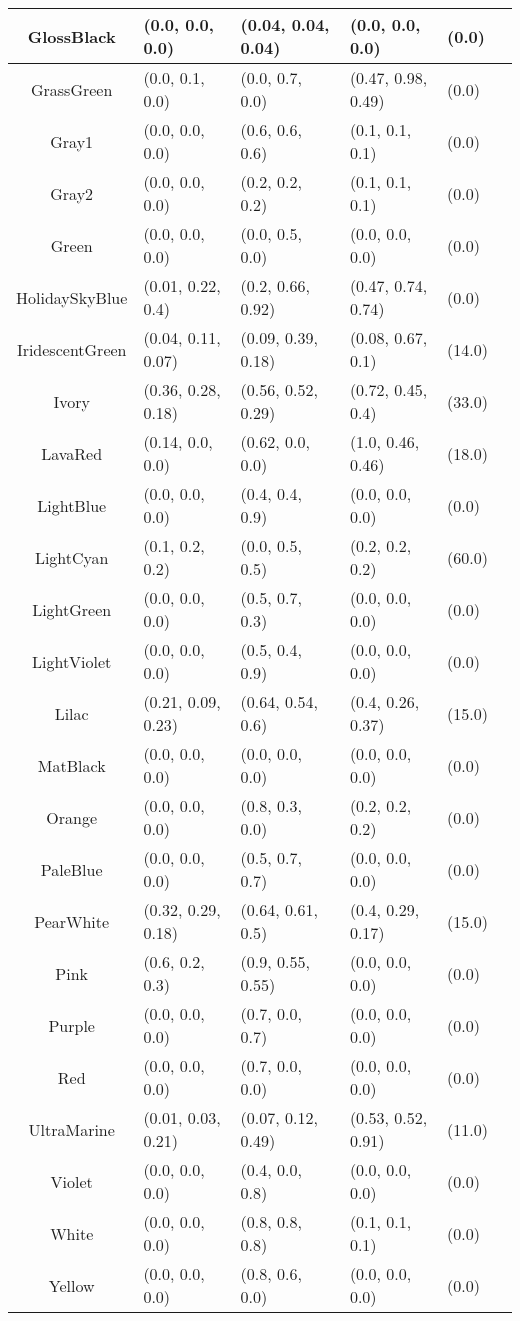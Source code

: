 \begin{table}[H]
\begin{small}
\begin{center}
\begin{tabular}{|c||l|l|l|l|l|}
GlossBlack & (0.0, 0.0, 0.0) & (0.04, 0.04, 0.04) & (0.0, 0.0, 0.0) & (0.0) \\ \hline
GrassGreen & (0.0, 0.1, 0.0) & (0.0, 0.7, 0.0) & (0.47, 0.98, 0.49) & (0.0) \\ \hline
Gray1 & (0.0, 0.0, 0.0) & (0.6, 0.6, 0.6) & (0.1, 0.1, 0.1) & (0.0) \\ \hline
Gray2 & (0.0, 0.0, 0.0) & (0.2, 0.2, 0.2) & (0.1, 0.1, 0.1) & (0.0) \\ \hline
Green & (0.0, 0.0, 0.0) & (0.0, 0.5, 0.0) & (0.0, 0.0, 0.0) & (0.0) \\ \hline
HolidaySkyBlue & (0.01, 0.22, 0.4) & (0.2, 0.66, 0.92) & (0.47, 0.74, 0.74) & (0.0) \\ \hline
IridescentGreen & (0.04, 0.11, 0.07) & (0.09, 0.39, 0.18) & (0.08, 0.67, 0.1) & (14.0) \\ \hline
Ivory & (0.36, 0.28, 0.18) & (0.56, 0.52, 0.29) & (0.72, 0.45, 0.4) & (33.0) \\ \hline
LavaRed & (0.14, 0.0, 0.0) & (0.62, 0.0, 0.0) & (1.0, 0.46, 0.46) & (18.0) \\ \hline
LightBlue & (0.0, 0.0, 0.0) & (0.4, 0.4, 0.9) & (0.0, 0.0, 0.0) & (0.0) \\ \hline
LightCyan & (0.1, 0.2, 0.2) & (0.0, 0.5, 0.5) & (0.2, 0.2, 0.2) & (60.0) \\ \hline
LightGreen & (0.0, 0.0, 0.0) & (0.5, 0.7, 0.3) & (0.0, 0.0, 0.0) & (0.0) \\ \hline
LightViolet & (0.0, 0.0, 0.0) & (0.5, 0.4, 0.9) & (0.0, 0.0, 0.0) & (0.0) \\ \hline
Lilac & (0.21, 0.09, 0.23) & (0.64, 0.54, 0.6) & (0.4, 0.26, 0.37) & (15.0) \\ \hline
MatBlack & (0.0, 0.0, 0.0) & (0.0, 0.0, 0.0) & (0.0, 0.0, 0.0) & (0.0) \\ \hline
Orange & (0.0, 0.0, 0.0) & (0.8, 0.3, 0.0) & (0.2, 0.2, 0.2) & (0.0) \\ \hline
PaleBlue & (0.0, 0.0, 0.0) & (0.5, 0.7, 0.7) & (0.0, 0.0, 0.0) & (0.0) \\ \hline
PearWhite & (0.32, 0.29, 0.18) & (0.64, 0.61, 0.5) & (0.4, 0.29, 0.17) & (15.0) \\ \hline
Pink & (0.6, 0.2, 0.3) & (0.9, 0.55, 0.55) & (0.0, 0.0, 0.0) & (0.0) \\ \hline
Purple & (0.0, 0.0, 0.0) & (0.7, 0.0, 0.7) & (0.0, 0.0, 0.0) & (0.0) \\ \hline
Red & (0.0, 0.0, 0.0) & (0.7, 0.0, 0.0) & (0.0, 0.0, 0.0) & (0.0) \\ \hline
UltraMarine & (0.01, 0.03, 0.21) & (0.07, 0.12, 0.49) & (0.53, 0.52, 0.91) & (11.0) \\ \hline
Violet & (0.0, 0.0, 0.0) & (0.4, 0.0, 0.8) & (0.0, 0.0, 0.0) & (0.0) \\ \hline
White & (0.0, 0.0, 0.0) & (0.8, 0.8, 0.8) & (0.1, 0.1, 0.1) & (0.0) \\ \hline
Yellow & (0.0, 0.0, 0.0) & (0.8, 0.6, 0.0) & (0.0, 0.0, 0.0) & (0.0) \\ \hline
\end{tabular}
\end{center}
\end{small}
\end{table}
